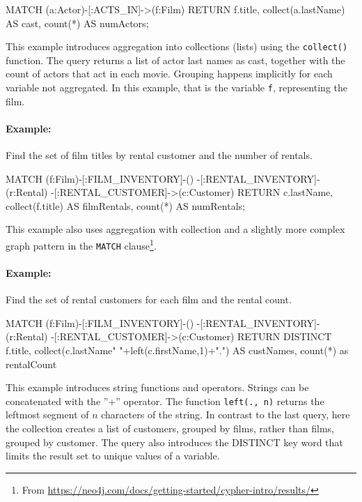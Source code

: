 \begin{samepage}
\begin{cyphercode}
MATCH (a:Actor)-[:ACTS_IN]->(f:Film) 
RETURN f.title, 
       collect(a.lastName) AS cast, 
       count(*) AS numActors;
\end{cyphercode}
\end{samepage}

This example introduces aggregation into collections (lists) using the \texttt{collect()} function. The query returns a list of actor last names as cast, together with the count of actors that act in each movie. Grouping happens implicitly for each variable not aggregated. In this example, that is the variable \texttt{f}, representing the film.

\paragraph*{Example:} Find the set of film titles by rental customer and the number of rentals.

\begin{samepage}
\begin{cyphercode}
MATCH (f:Film)-[:FILM_INVENTORY]-()
      -[:RENTAL_INVENTORY]-(r:Rental)
      -[:RENTAL_CUSTOMER]->(c:Customer)
RETURN c.lastName, 
       collect(f.title) AS filmRentals, 
       count(*) AS numRentals;
\end{cyphercode}
\end{samepage}

This example also uses aggregation with collection and a slightly more complex graph pattern in the \texttt{MATCH} clause\footnote{From \url{https://neo4j.com/docs/getting-started/cypher-intro/results/}}.

\paragraph*{Example:} Find the set of rental customers for each film and the rental count.

\begin{samepage}
\begin{cyphercode}
MATCH (f:Film)-[:FILM_INVENTORY]-()
      -[:RENTAL_INVENTORY]-(r:Rental)
      -[:RENTAL_CUSTOMER]->(c:Customer)
RETURN DISTINCT f.title, 
      collect(c.lastName" "+left(c.firstName,1)+".") AS custNames, 
      count(*) as rentalCount
\end{cyphercode}
\end{samepage}

This example introduces string functions and operators. Strings can be concatenated with the ''+'' operator. The function \texttt{left(., n)} returns the leftmost segment of $n$ characters of the string. In contrast to the last query, here the collection creates a list of customers, grouped by films, rather than films, grouped by customer. The query also introduces the DISTINCT key word that limits the result set to unique values of a variable.


